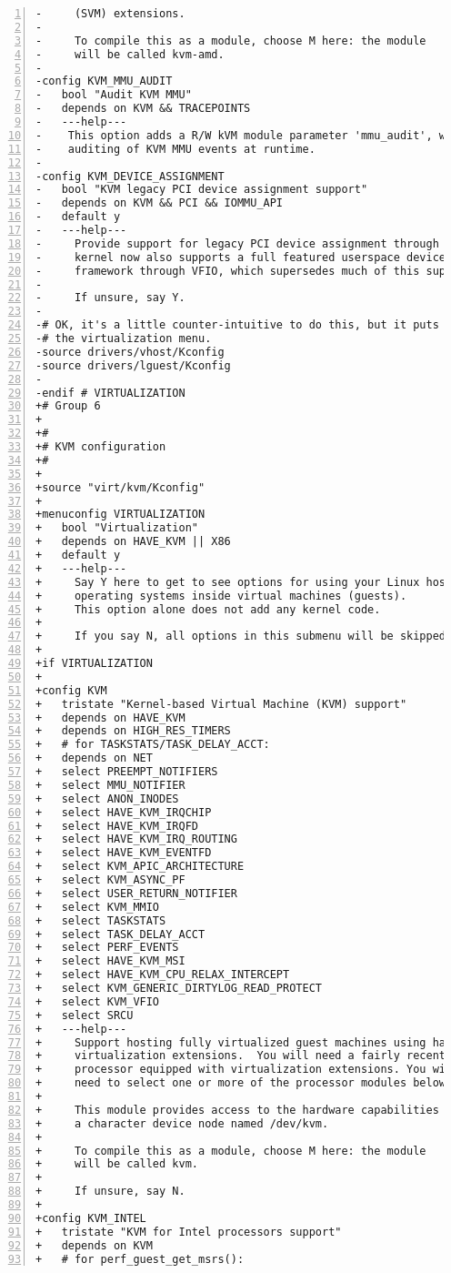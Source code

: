\documentclass[10pt,draftclsnofoot,journal,compsoc,onecolumn]{IEEEtran}
\begin{document}
\begin{lstlisting}[numbers=left]
-	  (SVM) extensions.
-
-	  To compile this as a module, choose M here: the module
-	  will be called kvm-amd.
-
-config KVM_MMU_AUDIT
-	bool "Audit KVM MMU"
-	depends on KVM && TRACEPOINTS
-	---help---
-	 This option adds a R/W kVM module parameter 'mmu_audit', which allows
-	 auditing of KVM MMU events at runtime.
-
-config KVM_DEVICE_ASSIGNMENT
-	bool "KVM legacy PCI device assignment support"
-	depends on KVM && PCI && IOMMU_API
-	default y
-	---help---
-	  Provide support for legacy PCI device assignment through KVM.  The
-	  kernel now also supports a full featured userspace device driver
-	  framework through VFIO, which supersedes much of this support.
-
-	  If unsure, say Y.
-
-# OK, it's a little counter-intuitive to do this, but it puts it neatly under
-# the virtualization menu.
-source drivers/vhost/Kconfig
-source drivers/lguest/Kconfig
-
-endif # VIRTUALIZATION
+# Group 6
+
+#
+# KVM configuration
+#
+
+source "virt/kvm/Kconfig"
+
+menuconfig VIRTUALIZATION
+	bool "Virtualization"
+	depends on HAVE_KVM || X86
+	default y
+	---help---
+	  Say Y here to get to see options for using your Linux host to run other
+	  operating systems inside virtual machines (guests).
+	  This option alone does not add any kernel code.
+
+	  If you say N, all options in this submenu will be skipped and disabled.
+
+if VIRTUALIZATION
+
+config KVM
+	tristate "Kernel-based Virtual Machine (KVM) support"
+	depends on HAVE_KVM
+	depends on HIGH_RES_TIMERS
+	# for TASKSTATS/TASK_DELAY_ACCT:
+	depends on NET
+	select PREEMPT_NOTIFIERS
+	select MMU_NOTIFIER
+	select ANON_INODES
+	select HAVE_KVM_IRQCHIP
+	select HAVE_KVM_IRQFD
+	select HAVE_KVM_IRQ_ROUTING
+	select HAVE_KVM_EVENTFD
+	select KVM_APIC_ARCHITECTURE
+	select KVM_ASYNC_PF
+	select USER_RETURN_NOTIFIER
+	select KVM_MMIO
+	select TASKSTATS
+	select TASK_DELAY_ACCT
+	select PERF_EVENTS
+	select HAVE_KVM_MSI
+	select HAVE_KVM_CPU_RELAX_INTERCEPT
+	select KVM_GENERIC_DIRTYLOG_READ_PROTECT
+	select KVM_VFIO
+	select SRCU
+	---help---
+	  Support hosting fully virtualized guest machines using hardware
+	  virtualization extensions.  You will need a fairly recent
+	  processor equipped with virtualization extensions. You will also
+	  need to select one or more of the processor modules below.
+
+	  This module provides access to the hardware capabilities through
+	  a character device node named /dev/kvm.
+
+	  To compile this as a module, choose M here: the module
+	  will be called kvm.
+
+	  If unsure, say N.
+
+config KVM_INTEL
+	tristate "KVM for Intel processors support"
+	depends on KVM
+	# for perf_guest_get_msrs():

\end{lstlisting}
\end{document}
